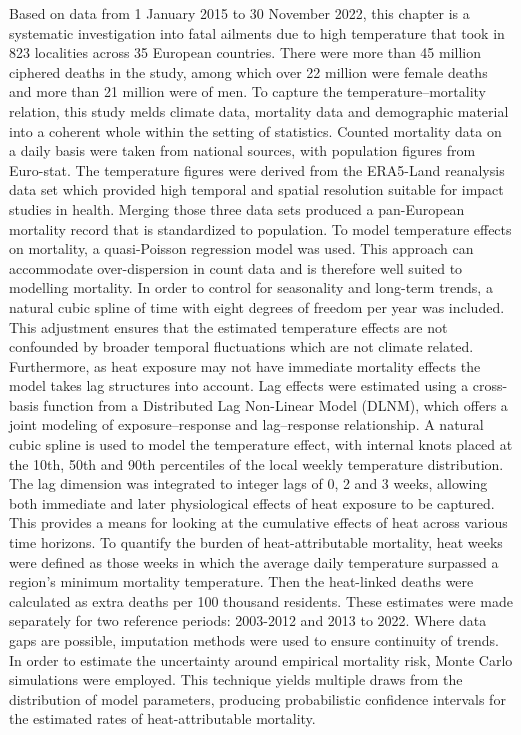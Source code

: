 \documentclass[
]{krantz}
\begin{document}
Based on data from 1 January 2015 to 30 November 2022, this chapter is a systematic investigation into fatal ailments due to high temperature that took in 823 localities across 35 European countries. There were more than 45 million ciphered deaths in the study, among which over 22 million were female deaths and more than 21 million were of men. To capture the temperature--mortality relation, this study melds climate data, mortality data and demographic material into a coherent whole within the setting of statistics. Counted mortality data on a daily basis were taken from national sources, with population figures from Euro-stat. The temperature figures were derived from the ERA5-Land reanalysis data set which provided high temporal and spatial resolution suitable for impact studies in health. Merging those three data sets produced a pan-European mortality record that is standardized to population. To model temperature effects on mortality, a quasi-Poisson regression model was used. This approach can accommodate over-dispersion in count data and is therefore well suited to modelling mortality. In order to control for seasonality and long-term trends, a natural cubic spline of time with eight degrees of freedom per year was included. This adjustment ensures that the estimated temperature effects are not confounded by broader temporal fluctuations which are not climate related. Furthermore, as heat exposure may not have immediate mortality effects the model takes lag structures into account. Lag effects were estimated using a cross-basis function from a Distributed Lag Non-Linear Model (DLNM), which offers a joint modeling of exposure--response and lag--response relationship. A natural cubic spline is used to model the temperature effect, with internal knots placed at the 10th, 50th and 90th percentiles of the local weekly temperature distribution. The lag dimension was integrated to integer lags of 0, 2 and 3 weeks, allowing both immediate and later physiological effects of heat exposure to be captured. This provides a means for looking at the cumulative effects of heat across various time horizons. To quantify the burden of heat-attributable mortality, heat weeks were defined as those weeks in which the average daily temperature surpassed a region's minimum mortality temperature. Then the heat-linked deaths were calculated as extra deaths per 100 thousand residents. These estimates were made separately for two reference periods: 2003-2012 and 2013 to 2022. Where data gaps are possible, imputation methods were used to ensure continuity of trends. In order to estimate the uncertainty around empirical mortality risk, Monte Carlo simulations were employed. This technique yields multiple draws from the distribution of model parameters, producing probabilistic confidence intervals for the estimated rates of heat-attributable mortality.
\end{document}
